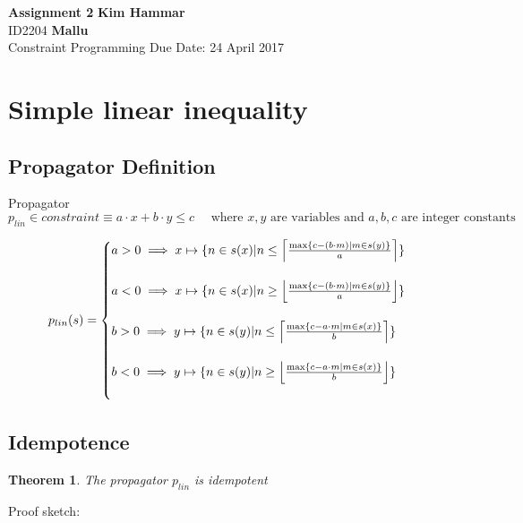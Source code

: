\documentclass[a4paper, 11pt]{article}
\newtheorem{theorem}{Theorem}[section]
\newcommand\mymapsto{\mathrel{\ooalign{$\rightarrow$\cr%
      \kern-.15ex\raise.275ex\hbox{\scalebox{1}[0.522]{$\mid$}}\cr}}}
\begin{document}
\noindent
\large\textbf{Assignment 2} \hfill \textbf{Kim Hammar} \\
\normalsize ID2204 \hfill  \textbf{Mallu} \\
Constraint Programming \hfill Due Date: 24 April 2017\\

\section*{Simple linear inequality}
\subsection*{Propagator Definition}
Propagator $p_{lin} \in constraint \equiv a \cdot x + b \cdot y \leq c \quad \text{ where }x,y \text{ are variables and } a,b,c \text{ are integer constants} $

\begin{gather*}
p_{lin}(s) = 
\begin{cases}
  a > 0 \implies x \mymapsto \{n \in s(x) | n \leq \left\lceil{\frac{\max\{c - (b \cdot m) | m \in s(y)\}}{a}}\right\rceil \}\\\\
  a < 0 \implies x \mymapsto \{n \in s(x) | n \geq \left\lfloor{\frac{\max\{c - (b \cdot m) | m \in s(y)\}}{a}}\right\rfloor \}\\\\
  b > 0 \implies y \mymapsto \{n \in s(y) | n \leq \left\lceil{\frac{\max\{c - a \cdot m | m \in s(x)\}}{b}}\right\rceil \}\\\\
  b < 0 \implies y \mymapsto \{n \in s(y) | n \geq \left\lfloor{\frac{\max\{c - a \cdot m | m \in s(x)\}}{b}}\right\rfloor \}\\\\
\end{cases}
\end{gather*}
\subsection*{Idempotence}
\begin{theorem}
The propagator $p_{lin}$ is idempotent
\end{theorem}
Proof sketch:
\end{document}
